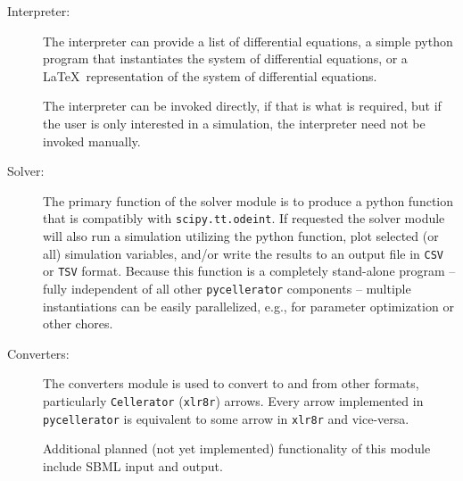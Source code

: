 \begin{description}
\item [Interpreter:]

The interpreter can provide a list of differential equations, a simple python program that instantiates the system of differential equations, or a \LaTeX\ representation of the system of differential equations.

The interpreter can be invoked directly, if that is what is required, but if the user is only interested in a simulation, the interpreter need not be invoked manually. 

\item [Solver:]

The primary function of the solver module is to produce a python function that is compatibly with {\tt scipy.tt.odeint}. If requested the solver module will also run a simulation utilizing the python function, plot selected (or all) simulation variables, and/or write the results to an output file in {\tt CSV} or {\tt TSV} format. Because this function is a completely stand-alone program -- fully independent of all other {\tt pycellerator} components -- multiple instantiations can be easily parallelized, e.g., for parameter optimization or other chores. 

\item [Converters:] The converters module is used to convert to and from other formats, particularly {\tt Cellerator} ({\tt xlr8r}) arrows. Every arrow implemented in {\tt pycellerator} is equivalent to some arrow in {\tt xlr8r} and vice-versa. 

Additional planned (not yet implemented) functionality of this module include SBML input and output. 



\end{description}






